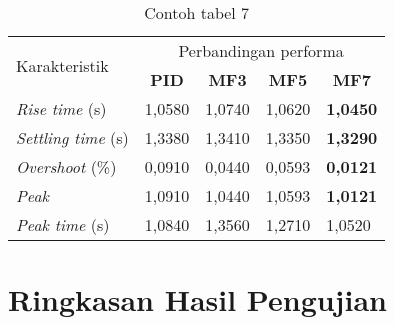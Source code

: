 \begin{table}[H]
    \centering
    \caption{Contoh tabel 7}
    \label{t perbandinganRespon}
    \begin{tabular}{lllll}
        \hline
        \multirow{2}{*}{Karakteristik} & \multicolumn{4}{c}{Perbandingan performa} \\ \cline{2-5} 
        & \multicolumn{1}{c}{\textbf{PID}} & \multicolumn{1}{c}{\textbf{MF3}} & \multicolumn{1}{c}{\textbf{MF5}} & \multicolumn{1}{c}{\textbf{MF7}} \\ \hline
        \textit{Rise time} (s)  & 1,0580  & 1,0740  & 1,0620    & \textbf{1,0450} \\
        \textit{Settling time} (s) & 1,3380 & 1,3410  & 1,3350  & \textbf{1,3290} \\
        \textit{Overshoot} (\%) & 0,0910 & 0,0440  & 0,0593     & \textbf{0,0121} \\
        \textit{Peak} & 1,0910 & 1,0440 & 1,0593 & \textbf{1,0121} \\
        \textit{Peak time} (s) & 1,0840 & 1,3560  & 1,2710      & 1,0520  \\ \hline
    \end{tabular}
\end{table}

\section{Ringkasan Hasil Pengujian}
\lipsum[1]